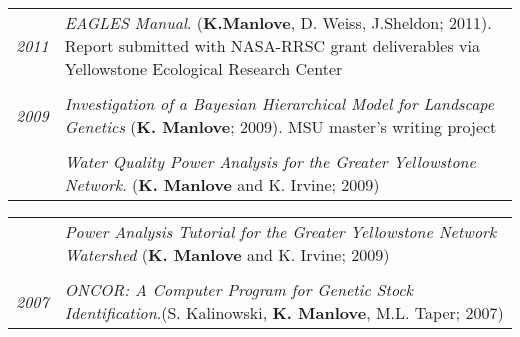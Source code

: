 \documentclass[9pt]{article}
\begin{document}
\begin{tabular}{p{.5cm} p{15cm}}
\hspace{-1.75cm} \footnotesize{\textit{2011}} & \hspace{-.5cm} \textit{EAGLES Manual}. (\textbf{K.Manlove}, D. Weiss, J.Sheldon; 2011).  Report submitted with NASA-RRSC grant deliverables via Yellowstone Ecological Research Center \\
\\
\hspace{-1.75cm} \footnotesize{\textit{2009}} & \hspace{-.5cm} \textit{Investigation of a Bayesian Hierarchical Model for Landscape Genetics} (\textbf{K. Manlove}; 2009). MSU master's writing project \\
\\
& \hspace{-.5cm}\textit{Water Quality Power Analysis for the Greater Yellowstone Network}. (\textbf{K. Manlove} and K. Irvine; 2009) 
\end{tabular}

\begin{tabular}{p{.5cm} p{15cm}}

&  \hspace{-.5cm}\textit{Power Analysis Tutorial for the Greater Yellowstone Network Watershed} (\textbf{K. Manlove} and K. Irvine; 2009) \\
\\

\hspace{-1.75cm} \footnotesize{\textit{2007}} & \hspace{-.5cm}\textit{ONCOR: A Computer Program for Genetic Stock Identification}.(S. Kalinowski,\textbf{ K. Manlove}, M.L. Taper; 2007)  \\
  
\end{tabular}
\end{document}
